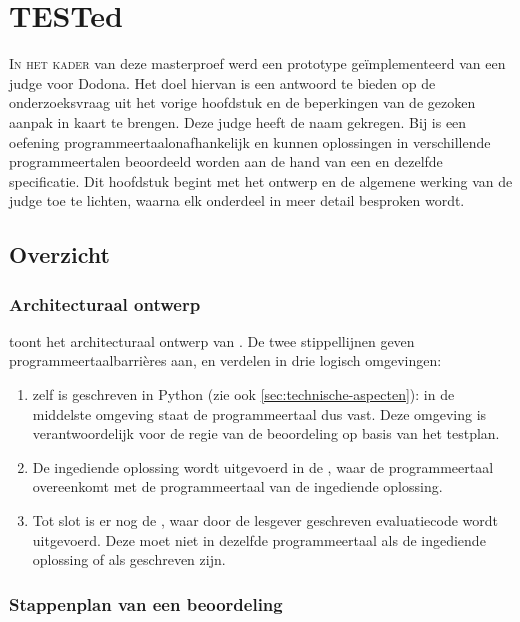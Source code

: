 \chapter{TESTed}\label{ch:tested}

\lettrine{I}{n het kader} van deze masterproef werd een prototype geïmplementeerd van een judge voor Dodona.
Het doel hiervan is een antwoord te bieden op de onderzoeksvraag uit het vorige hoofdstuk en de beperkingen van de gezoken aanpak in kaart te brengen.
Deze judge heeft de naam \term{\tested{}} gekregen.
Bij \tested{} is een oefening programmeertaalonafhankelijk en kunnen oplossingen in verschillende programmeertalen beoordeeld worden aan de hand van een en dezelfde specificatie.
Dit hoofdstuk begint met het ontwerp en de algemene werking van de judge toe te lichten, waarna elk onderdeel in meer detail besproken wordt.

\section{Overzicht}\label{sec:ontwerp}

\subsection{Architecturaal ontwerp}\label{subsec:architecturaal-overzicht}

 toont het architecturaal ontwerp van \tested{}.
De twee stippellijnen geven programmeertaalbarrières aan, en verdelen \tested{} in drie logisch omgevingen:

\begin{enumerate}
    \item \tested{} zelf is geschreven in Python (zie ook \cref{sec:technische-aspecten}): in de middelste omgeving staat de programmeertaal dus vast.
    Deze omgeving is verantwoordelijk voor de regie van de beoordeling op basis van het testplan.
    \item De ingediende oplossing wordt uitgevoerd in de , waar de programmeertaal overeenkomt met de programmeertaal van de ingediende oplossing.
    \item Tot slot is er nog de , waar door de lesgever geschreven evaluatiecode wordt uitgevoerd.
    Deze moet niet in dezelfde programmeertaal als de ingediende oplossing of als \tested{} geschreven zijn.
\end{enumerate}

\subsection{Stappenplan van een beoordeling}\label{subsec:stappenplan-van-een-beoordeling}

